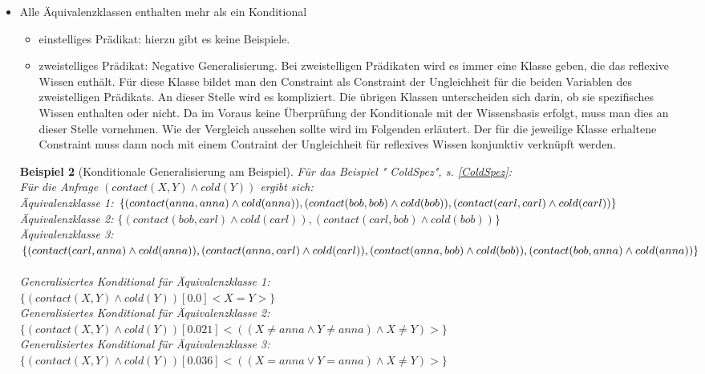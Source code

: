 \documentclass[draft]{scrreprt}
\newtheorem{Bsp}{Beispiel}[section]
\begin{document}
\begin{itemize}
\begin{itemize}
\begin{Bsp}[Konditionale Generalisierung ]
		\end{Bsp}
		\item zweistelliges Prädikat:\\	
		Dieser Fall kommt nicht vor, da die Klassen bei zweistelligen Prädikaten mindestens zwei Element enthalten.	
	\end{itemize}
	\item Alle Äquivalenzklassen enthalten mehr als ein Konditional
	\begin{itemize}
		\item einstelliges Prädikat: hierzu gibt es keine Beispiele.
		\item zweistelliges Prädikat: Negative Generalisierung. Bei zweistelligen Prädikaten wird es immer eine Klasse geben, die das reflexive Wissen enthält. Für diese Klasse bildet man den Constraint als Constraint der Ungleichheit für die beiden Variablen des zweistelligen Prädikats. An dieser Stelle wird es kompliziert. Die übrigen Klassen unterscheiden sich darin, ob sie spezifisches Wissen enthalten oder nicht. Da im Voraus keine Überprüfung der Konditionale mit der Wissensbasis erfolgt, muss man dies an dieser Stelle vornehmen. Wie der Vergleich aussehen sollte wird im Folgenden erläutert. Der für die jeweilige Klasse erhaltene Constraint muss dann noch mit einem Contraint der Ungleichheit für reflexives Wissen konjunktiv verknüpft werden. 
		\end{itemize}

		\begin{Bsp}[Konditionale Generalisierung am Beispiel]
			Für  das Beispiel "{} ColdSpez"{}, s. \ref{ColdSpez}:\\
			Für die Anfrage $ (contact(X,Y) \land cold(Y)) $ ergibt sich:\\
			Äquivalenzklasse 1: $ \{(contact(anna,anna) \land cold(anna)), (contact(bob,bob) \land cold(bob)), \\(contact(carl,carl) \land cold(carl)) \} $\\
			Äquivalenzklasse 2: $ \{(contact(bob,carl) \land cold(carl)), (contact(carl,bob) \land cold(bob)) \} $\\
			Äquivalenzklasse 3: $ \{(contact(carl,anna) \land cold(anna)), (contact(anna, carl) \land\\ cold(carl)), (contact(anna,bob) \land cold(bob)), (contact(bob, anna) \land cold(anna)) \} $\\
			\\
			\noindent
			Generalisiertes Konditional für Äquivalenzklasse 1: \\$ \{(contact(X,Y) \land cold(Y)) [0.0] <X = Y>\} $\\
			Generalisiertes Konditional für Äquivalenzklasse 2: \\$ \{(contact(X,Y) \land cold(Y)) [0.021] <((X \neq anna \land Y \neq anna) \land X \neq Y)>\} $\\
			Generalisiertes Konditional für Äquivalenzklasse 3:\\ $ \{(contact(X,Y) \land cold(Y)) [0.036] <((X = anna \lor Y = anna)\land X \neq Y)>\} $	
		\end{Bsp}
	
\end{itemize}
\end{document}
